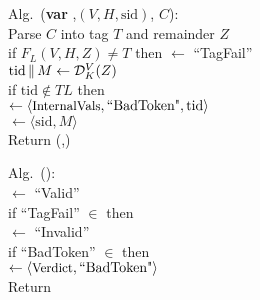 \begin{figure}
{\medskip
Alg.\ ({\bf var} ,$(V,H,\mathrm{sid})$, $C$):\\
\nudge Parse $C$ into tag $T$ and remainder $Z$\\ 
\nudge if $F_L(V,H,Z) \neq T$ then  $\gets$ ``TagFail''\\
\nudge $\mathrm{tid} \,\|\, M \gets \mathcal{D}_K^{V}(Z)$\\
\nudge if $\mathrm{tid}\not\in \mathit{TL}$ then\\
\nudge\nudge {} $\gets \langle
\textrm{\small InternalVals}, \mbox{``BadToken"}, \mathrm{tid} \rangle$\\
\nudge {} $\gets \langle \mathrm{sid}, M \rangle$\\
\nudge Return (,)

\medskip
Alg.\ ():\\
\nudge {} $\gets$ ``Valid''\\
\nudge if ``TagFail'' $\in$  then\\
\nudge\nudge {} $\gets$ ``Invalid''\\
\nudge if ``BadToken'' $\in$  then\\
\nudge\nudge {} $\gets \langle
\textrm{\small Verdict},\mbox{``BadToken"} \rangle$\\
\nudge Return 

}
\end{figure}
